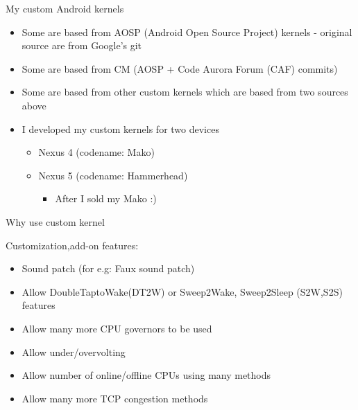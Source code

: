 \documentclass{beamer}
\begin{document}
\begin{frame}{My custom Android kernels}
 \begin{itemize}
  \item Some are based from AOSP (Android Open Source Project) kernels - original source are from Google's git
  \item Some are based from CM (AOSP + Code Aurora Forum (CAF) commits)
  \item Some are based from other custom kernels which are based from two sources above
 \end{itemize}

\end{frame}

\begin{frame}
 \begin{itemize}
  \item I developed my custom kernels for two devices
  \begin{itemize}
   \item Nexus 4 (codename: Mako)
   \item \pause Nexus 5 (codename: Hammerhead) 
   \begin{itemize}
    \item \pause After I sold my Mako :)
   \end{itemize}

  \end{itemize}

 \end{itemize}

\end{frame}


\begin{frame}{Why use custom kernel}
 
 Customization,add-on features:

 \begin{itemize}
  \item \pause Sound patch (for e.g: Faux sound patch)
  \item \pause Allow DoubleTaptoWake(DT2W) or Sweep2Wake, Sweep2Sleep (S2W,S2S) features
  \item \pause Allow many more CPU governors to be used
  \item \pause Allow under/overvolting
  \item \pause Allow number of online/offline CPUs using many methods
  \item \pause Allow many more TCP congestion methods
 \end{itemize}
  
\end{frame}
\end{document}
